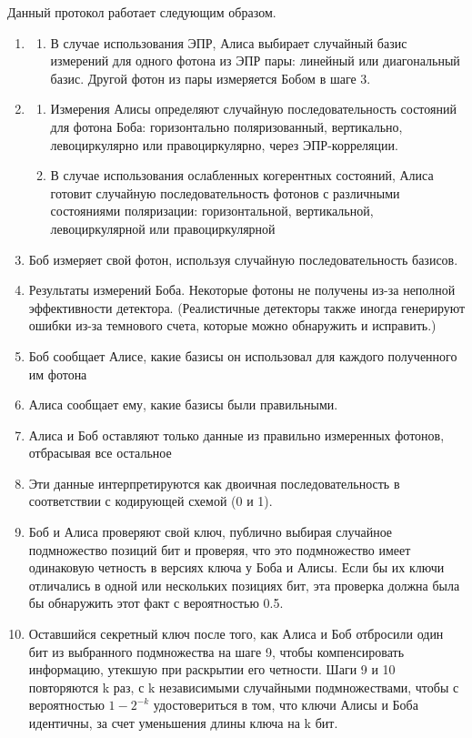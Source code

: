 Данный протокол работает следующим образом. 
\begin{enumerate}
    \item \begin{enumerate}
        \item В случае использования ЭПР, Алиса выбирает случайный базис измерений для одного фотона из ЭПР пары: линейный или диагональный базис. Другой фотон из пары измеряется Бобом в шаге 3.
    \end{enumerate}
    \item \begin{enumerate}
        \item Измерения Алисы определяют случайную последовательность состояний для фотона Боба: горизонтально поляризованный, вертикально, левоциркулярно или правоциркулярно, через ЭПР-корреляции.
        \item В случае использования ослабленных когерентных состояний, Алиса готовит случайную последовательность фотонов с различными состояниями поляризации: горизонтальной, вертикальной, левоциркулярной или правоциркулярной
    \end{enumerate}
    \item Боб измеряет свой фотон, используя случайную последовательность базисов.
    \item Результаты измерений Боба. Некоторые фотоны не получены из-за неполной эффективности детектора. (Реалистичные детекторы также иногда генерируют ошибки из-за темнового счета, которые можно обнаружить и исправить.)
    \item Боб сообщает Алисе, какие базисы он использовал для каждого полученного им фотона
    \item Алиса сообщает ему, какие базисы были правильными.
    \item Алиса и Боб оставляют только данные из правильно измеренных фотонов, отбрасывая все остальное
    \item Эти данные интерпретируются как двоичная последовательность в соответствии с кодирующей схемой (0 и 1).
    \item Боб и Алиса проверяют свой ключ, публично выбирая случайное подмножество позиций бит и проверяя, что это подмножество имеет одинаковую четность в версиях ключа у Боба и Алисы. Если бы их ключи отличались в одной или нескольких позициях бит, эта проверка должна была бы обнаружить этот факт с вероятностью 0.5.
    \item Оставшийся секретный ключ после того, как Алиса и Боб отбросили один бит из выбранного подмножества на шаге 9, чтобы компенсировать информацию, утекшую при раскрытии его четности. Шаги 9 и 10 повторяются k раз, с k независимыми случайными подмножествами, чтобы с вероятностью $1 - 2^{-k}$ удостовериться в том, что ключи Алисы и Боба идентичны, за счет уменьшения длины ключа на k бит.
\end{enumerate}

